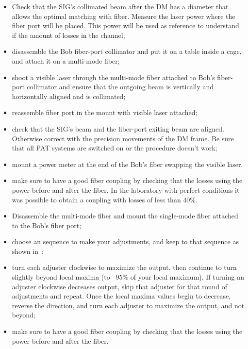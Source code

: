 \begin{itemize}
  \item Check that the SIG's collimated beam after the DM has a diameter that allows the optimal matching with fiber. Measure the laser power where the fiber port will be placed. This power will be used as reference to understand if the amount of losses in the channel;
  \item disassemble the Bob fiber-port collimator and put it on a table inside a cage, and attach it on a multi-mode fiber;
  \item shoot a visible laser through the multi-mode fiber attached to Bob's fiber-port collimator and ensure that the outgoing beam is vertically and horizontally aligned and is collimated;
  \item reassemble fiber port in the mount with visible laser attached;
  \item check that the SIG's beam and the fiber-port exiting beam are aligned. Otherwise correct with the precision movements of the DM frame. Be sure that all PAT systems are switched on or the procedure doesn't work;
  \item mount a power meter at the end of the Bob's fiber swapping the visible laser.
  \item make sure to have a good fiber coupling by checking that the losses using the power before and after the fiber. In the laboratory with perfect conditions it was possible to obtain a coupling with losses of less than 40\%.
\end{itemize}

\begin{itemize}
  \item Disassemble the multi-mode fiber and mount the single-mode fiber attached to the Bob's fiber port;
  \item choose an sequence to make your adjustments, and keep to that sequence as shown in~;
  \item turn each adjuster clockwise to maximize the output, then continue to turn slightly beyond local maxima (to ~95\% of your local maximum). If turning an adjuster clockwise decreases output, skip that adjuster for that round of adjustments and repeat. Once the local maxima values begin to decrease, reverse the direction, and turn each adjuster to maximize the output, and not beyond;
  \item make sure to have a good fiber coupling by checking that the losses using the power before and after the fiber.
\end{itemize}

